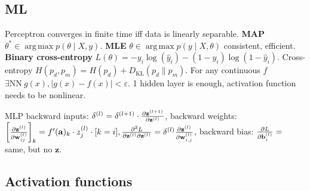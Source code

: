 \documentclass[11pt,landscape,a4paper,fleqn]{article}
\newcommand{\kl}[2]{D_{\mathrm{KL}}(#1\lVert#2)}
\DeclareMathOperator*{\argmax}{arg\,max}
\def\myvector#1{\mathbf{#1}}
\def\va{{\myvector{a}}}
\def\vb{{\myvector{b}}}
\def\vw{{\myvector{w}}}
\def\vz{{\myvector{z}}}
\begin{document}
\setlength{\columnseprule}{0.1pt}
	

\begin{multicols*}{4}



\setlength{\columnseprule}{0.1pt}
\section{ML}

Perceptron converges in finite time iff data is linearly separable.
\textbf{MAP} $\theta^* \in \argmax p(\theta \mid X, y)$.
\textbf{MLE} $\theta \in \argmax p(y \mid X, \theta)$ consistent, efficient.
\textbf{Binary cross-entropy} $L(\theta) = - y_i \log(\hat{y}_i) - (1 - y_i) \log(1 - \hat{y}_i)$.
Cross-entropy $H(p_d, p_m) = H(p_d) + \kl{p_d}{p_m}$.
For any continuous $f$ $\exists \mathrm{NN}\ g(x), |g(x) - f(x)| < \varepsilon$.
1 hidden layer is enough, activation function needs to be nonlinear.

MLP backward inputs: $\delta^{(l)} = \delta^{(l + 1)} \cdot \pdv{\vz^{(l + 1)}}{\vz^{(l)}}$,
backward weights: $\left[\pdv{\vz^{(l)}}{\vw_{ij}^{(l)}}\right]_k = f'(\va)_k \cdot z_j^{(l)} \cdot [k = i],
\pdv{L}{\vz^{(l)}}{\vz^{(l)}} = \delta^{(l)} \pdv{\vz^{(l)}}{\vw_{i,j}^{(l)}}$,
backward bias: $\pdv{L}{\vb_i^{(l)}} =$ same, but no $\vz$.

\subsection{Activation functions} \phantom{a}


\end{multicols*}
\end{document}
